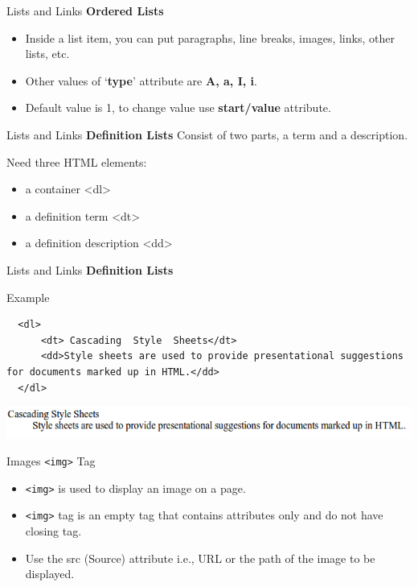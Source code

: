 \documentclass[14pt]{beamer}
\begin{document}
\begin{frame}{Lists and Links}
 \textbf{Ordered Lists}
 \begin{itemize}
 \item Inside a list item, you can put paragraphs, line breaks, images, links, other lists, etc.
 \item Other values of `\textbf{type}' attribute are \textbf{A, a, I, i}.
 \item Default value is 1, to change value use \textbf{start/value} attribute.
 \end{itemize} 
\end{frame}

\begin{frame}{Lists and Links}
 \textbf{Definition Lists} Consist of two parts, a term and a description.

Need three HTML elements:
\begin{itemize}
 \item a container <dl>
 \item a definition term <dt>
 \item a definition description <dd>
\end{itemize}
\end{frame}

\begin{frame}[fragile]{Lists and Links}
\textbf{Definition Lists}
\begin{block}{Example}
 \begin{lstlisting}
  <dl>
      <dt> Cascading  Style  Sheets</dt>
      <dd>Style sheets are used to provide presentational suggestions for documents marked up in HTML.</dd>
  </dl>
 \end{lstlisting}
\end{block}
\includegraphics[scale=.5]{definition-list.png}
\end{frame}

\begin{frame}{Images}
 \lstinline!<img>!  Tag 
 \begin{itemize}
  \item \lstinline!<img>! is used to display an image on a page. 
  \item \lstinline!<img>! tag is an empty tag that contains attributes only and do not have  closing tag.
  \item Use the src (Source) attribute i.e., URL  or the path of the image to be displayed.
 \end{itemize}
\end{frame}
\end{document}
